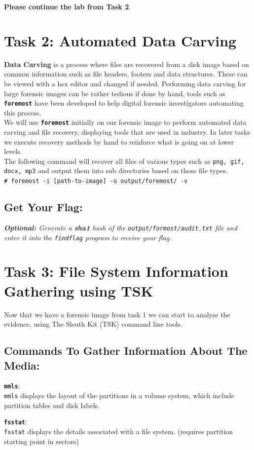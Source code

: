 \documentclass[a4paper,11pt]{article}
\begin{document}
\noindent
\textbf{Please continue the lab from Task 2}.


\section{Task 2: Automated Data Carving}\label{sec:task2-auto-data-carving}
\textbf{Data Carving} is a process where files are recovered from a disk image based on common information such as file headers, footers and data structures. These can be viewed with a hex editor and changed if needed. Performing data carving for large forensic images can be rather tedious if done by hand, tools such as \texttt{\textbf{foremost}} have been developed to help digital forensic investigators automating this process. 
\\

We will use \texttt{\textbf{foremost}} initially on our forensic image to perform automated data carving and file recovery, displaying tools that are used in industry. In later tasks we execute recovery methods by hand to reinforce what is going on at lower levels.
\\

The following command will recover all files of various types such as \texttt{png, gif, docx, mp3} and output them into sub directories based on those file types.
\\

\noindent
\verb|# foremost -i [path-to-image] -o output/foremost/ -v|
\subsection*{Get Your Flag:}
\noindent
\textit{\textbf{Optional:} Generate a \textbf{\textit{sha1}} hash of the \texttt{output/formost/audit.txt} file and enter it into the \texttt{findflag} program to receive your flag.}

\section{Task 3: File System Information Gathering using TSK}\label{sec:task3-fs-info-gathering}
Now that we have a forensic image from task 1 we can start to analyse the evidence, using The Sleuth Kit (TSK) command line tools.

\subsection*{Commands To Gather Information About The Media:}
\begin{itemize*}
	\item \textbf{\texttt{mmls}}:\\ \texttt{mmls} displays the layout of the partitions in a volume system, which include partition tables and disk labels.
	\item \textbf{\texttt{fsstat}}:\\ \texttt{fsstat} displays the details associated with a file system. (requires partition starting point in sectors)
\end{itemize*}
\end{document}
